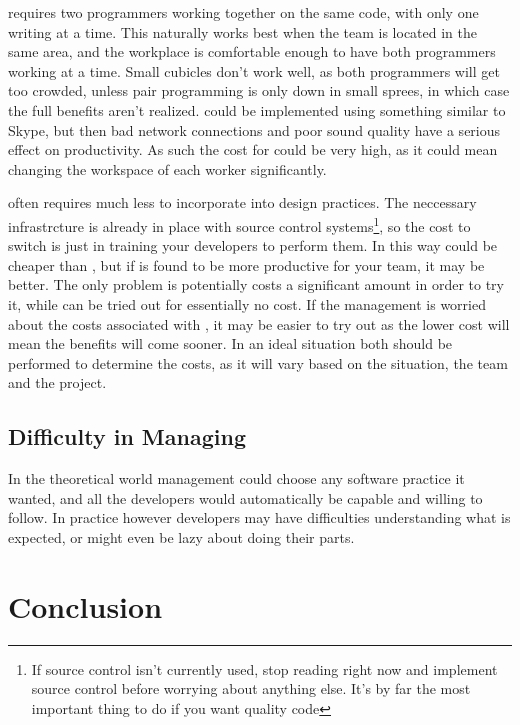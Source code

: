 \documentclass{article}
\begin{document}
\PP requires two programmers working together on the same code, with only one writing at a time. This naturally works best when the team is located in the same area, and the workplace is comfortable enough to have both programmers working at a time. Small cubicles don't work well, as both programmers will get too crowded, unless pair programming is only down in small sprees, in which case the full benefits aren't realized. \PP could be implemented using something similar to Skype, but then bad network connections and poor sound quality have a serious effect on productivity. As such the cost for \PP could be very high, as it could mean changing the workspace of each worker significantly.

\CR often requires much less to incorporate into design practices. The neccessary infrastrcture is already in place with source control systems\footnote{If source control isn't currently used, stop reading right now and implement source control before worrying about anything else. It's by far the most important thing to do if you want quality code}, so the cost to switch is just in training your developers to perform them. In this way \CR could be cheaper than \PP, but if \PP is found to be more productive for your team, it may be better. The only problem is \PP potentially costs a significant amount in order to try it, while \CR can be tried out for essentially no cost. If the management is worried about the costs associated with \PP, it may be easier to try out \CR as the lower cost will mean the benefits will come sooner. In an ideal situation both should be performed to determine the costs, as it will vary based on the situation, the team and the project.


\subsection{Difficulty in Managing}

In the theoretical world management could choose any software practice it wanted, and all the developers would automatically be capable and willing to follow. In practice however developers may have difficulties understanding what is expected, or might even be lazy about doing their parts.

\section{Conclusion}
\end{document}
